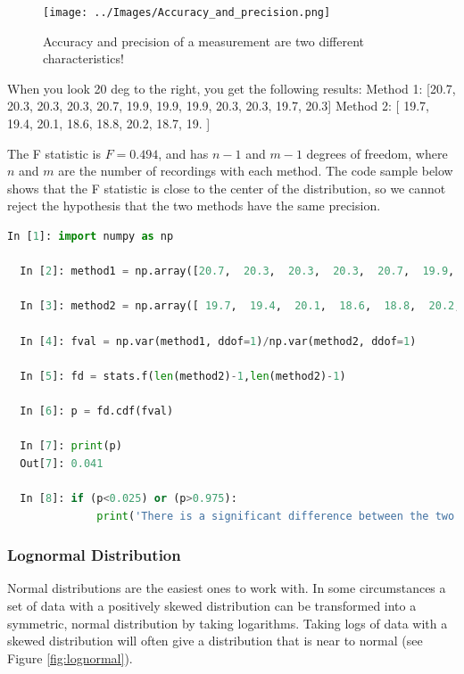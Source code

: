 \begin{figure}
  \centering
  \texttt{[image: ../Images/Accuracy\_and\_precision.png]}\\
  \caption{Accuracy and precision of a measurement are two different characteristics!}
  \label{fig:accuracy}
\end{figure}

When you look 20 deg to the right, you get the following results:
Method 1: [20.7,  20.3,  20.3,  20.3,  20.7,  19.9,  19.9,  19.9,  20.3,
        20.3,  19.7,  20.3]
Method 2: [ 19.7,  19.4,  20.1,  18.6,  18.8,  20.2,  18.7,  19. ]

The F statistic is $F = 0.494$, and has $n-1$ and $m-1$ degrees of freedom, where $n$ and $m$ are the number of recordings with each method. The code sample below shows that the F statistic is close to the center of the distribution, so we cannot reject the hypothesis that the two methods have the same precision.

\begin{lstlisting}[language=Python]
  In [1]: import numpy as np

  In [2]: method1 = np.array([20.7,  20.3,  20.3,  20.3,  20.7,  19.9,  19.9,  19.9,  20.3, 20.3,  19.7,  20.3])

  In [3]: method2 = np.array([ 19.7,  19.4,  20.1,  18.6,  18.8,  20.2,  18.7,  19. ])

  In [4]: fval = np.var(method1, ddof=1)/np.var(method2, ddof=1)

  In [5]: fd = stats.f(len(method2)-1,len(method2)-1)

  In [6]: p = fd.cdf(fval)

  In [7]: print(p)
  Out[7]: 0.041

  In [8]: if (p<0.025) or (p>0.975):
              print('There is a significant difference between the two distributions.')
\end{lstlisting}


\subsubsection{Lognormal Distribution}

Normal distributions are the easiest ones to work with. In some circumstances a set of data with a positively skewed distribution can be transformed into a symmetric, normal distribution by taking logarithms. Taking logs of data with a skewed distribution will often give a distribution that is near to normal (see Figure \ref{fig:lognormal}).

